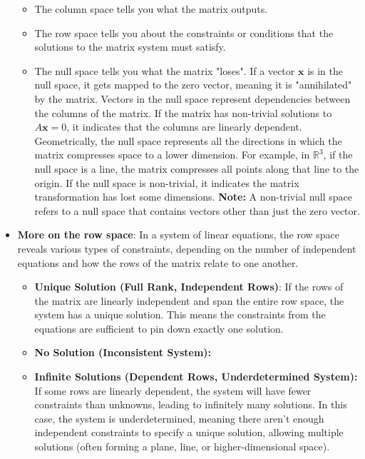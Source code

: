 \documentclass{report}
\begin{document}
\begin{itemize}
        \begin{itemize}
            \item The column space tells you what the matrix outputs.
            \item The row space tells you about the constraints or conditions that the solutions to the matrix system must satisfy.
            \item The null space tells you what the matrix "loses". If a vector $\mathbf{x}$ is in the null space, it gets mapped to the zero vector, meaning it is "annihilated" by the matrix. Vectors in the null space represent dependencies between the columns of the matrix. If the matrix has non-trivial solutions to $A\mathbf{x}=0$, it indicates that the columns are linearly dependent.
                \bigbreak \noindent 
                Geometrically, the null space represents all the directions in which the matrix compresses space to a lower dimension.
                For example, in $\mathbb{R}^{3}$, if the null space is a line, the matrix compresses all points along that line to the origin.
                \bigbreak \noindent 
                If the null space is non-trivial, it indicates the matrix transformation has lost some dimensions.
                \bigbreak \noindent 
                \textbf{Note:} A non-trivial null space refers to a null space that contains vectors other than just the zero vector.
        \end{itemize}
    \item \textbf{More on the row space}: In a system of linear equations, the row space reveals various types of constraints, depending on the number of independent equations and how the rows of the matrix relate to one another. 
        \begin{itemize}
            \item \textbf{Unique Solution (Full Rank, Independent Rows)}: If the rows of the matrix are linearly independent and span the entire row space, the system has a unique solution. This means the constraints from the equations are sufficient to pin down exactly one solution.
            \item \textbf{No Solution (Inconsistent System):}
            \item \textbf{Infinite Solutions (Dependent Rows, Underdetermined System):} If some rows are linearly dependent, the system will have fewer constraints than unknowns, leading to infinitely many solutions. In this case, the system is underdetermined, meaning there aren’t enough independent constraints to specify a unique solution, allowing multiple solutions (often forming a plane, line, or higher-dimensional space).

\end{itemize}
\end{itemize}
\end{document}

